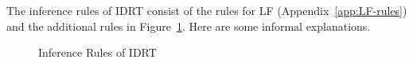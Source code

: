 \documentclass[submission,copyright,creativecommons]{eptcs}
\begin{document}
The inference rules of IDRT consist of the rules for LF (Appendix~\ref{app:LF-rules}) and the additional rules in Figure~\ref{DRT-rules}. Here are some informal explanations.
\begin{figure}[top]
 \caption{Inference Rules of IDRT} \label{DRT-rules}
\end{figure}
\end{document}
